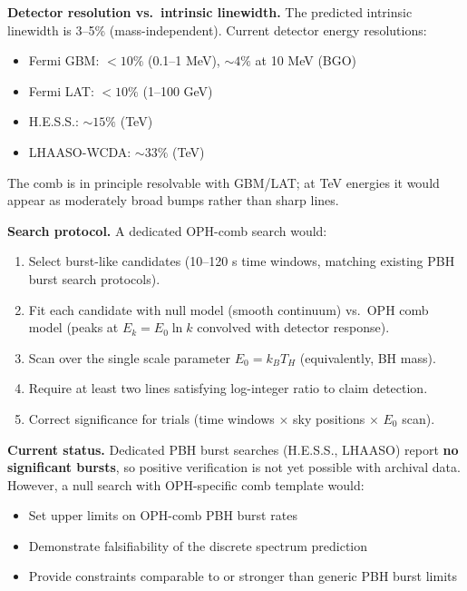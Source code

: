 \documentclass[
]{article}
\providecommand{\tightlist}{%
  \setlength{\itemsep}{0pt}\setlength{\parskip}{0pt}}
\begin{document}
\textbf{Detector resolution vs.~intrinsic linewidth.} The predicted
intrinsic linewidth is 3--5\% (mass-independent). Current detector
energy resolutions:

\begin{itemize}
\tightlist
\item
  Fermi GBM: \(< 10\%\) (0.1--1 MeV), \(\sim 4\%\) at 10 MeV (BGO)
\item
  Fermi LAT: \(< 10\%\) (1--100 GeV)
\item
  H.E.S.S.: \(\sim 15\%\) (TeV)
\item
  LHAASO-WCDA: \(\sim 33\%\) (TeV)
\end{itemize}

The comb is in principle resolvable with GBM/LAT; at TeV energies it
would appear as moderately broad bumps rather than sharp lines.

\textbf{Search protocol.} A dedicated OPH-comb search would:

\begin{enumerate}
\def\labelenumi{\arabic{enumi}.}
\tightlist
\item
  Select burst-like candidates (10--120 s time windows, matching
  existing PBH burst search protocols).
\item
  Fit each candidate with null model (smooth continuum) vs.~OPH comb
  model (peaks at \(E_k = E_0 \ln k\) convolved with detector response).
\item
  Scan over the single scale parameter \(E_0 = k_B T_H\) (equivalently,
  BH mass).
\item
  Require at least two lines satisfying log-integer ratio to claim
  detection.
\item
  Correct significance for trials (time windows \(\times\) sky positions
  \(\times\) \(E_0\) scan).
\end{enumerate}

\textbf{Current status.} Dedicated PBH burst searches (H.E.S.S., LHAASO)
report \textbf{no significant bursts}, so positive verification is not
yet possible with archival data. However, a null search with
OPH-specific comb template would:

\begin{itemize}
\tightlist
\item
  Set upper limits on OPH-comb PBH burst rates
\item
  Demonstrate falsifiability of the discrete spectrum prediction
\item
  Provide constraints comparable to or stronger than generic PBH burst
  limits
\end{itemize}
\end{document}
